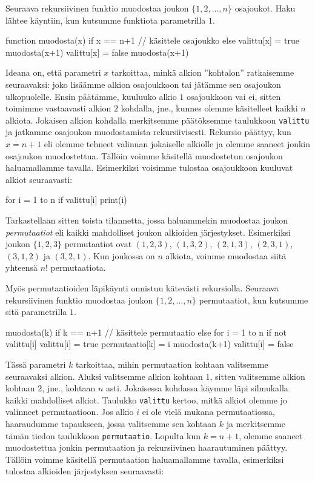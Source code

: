 Seuraava rekursiivinen funktio muodostaa joukon
$\{1,2,\dots,n\}$ osajoukot.
Haku lähtee käyntiin, kun kutsumme funktiota
parametrilla $1$.

\begin{code}
function muodosta(x)
    if x == n+1
        // käsittele osajoukko
    else
        valittu[x] = true
        muodosta(x+1)
        valittu[x] = false
        muodosta(x+1)
\end{code}

Ideana on, että parametri $x$ tarkoittaa, minkä alkion
''kohtalon'' ratkaisemme seuraavaksi: joko lisäämme alkion
osajoukkoon tai jätämme sen osa\-joukon ulkopuolelle.
Ensin päätämme, kuuluuko alkio $1$ osajoukkoon vai ei,
sitten toimimme vastaavasti alkion $2$ kohdalla, jne.,
kunnes olemme käsitelleet kaikki $n$ alkiota.
Jokaisen alkion kohdalla merkitsemme päätöksemme taulukkoon
\texttt{valittu} ja jatkamme osajoukon muodostamista rekursiivisesti.
Rekursio päät\-tyy, kun $x=n+1$ eli olemme tehneet valinnan
jokaiselle alkiolle ja olemme saaneet jonkin osajoukon muodostettua.
Tällöin voimme käsitellä muodostetun osajoukon haluamallamme tavalla.
Esimerkiksi voisimme tulostaa osajoukkoon kuuluvat alkiot seuraavasti:

\begin{code}
for i = 1 to n
    if valittu[i]
        print(i)
\end{code}

Tarkastellaan sitten toista tilannetta, jossa haluammekin
muodostaa joukon \emph{permutaatiot}
eli kaikki mahdolliset joukon alkioiden järjestykset.
Esimerkiksi joukon $\{1,2,3\}$ permutaatiot ovat
$(1,2,3)$, $(1,3,2)$, $(2,1,3)$, $(2,3,1)$, $(3,1,2)$ ja $(3,2,1)$.
Kun joukossa on $n$ alkiota, voimme muodostaa siitä yhteensä $n!$ permutaatiota.

Myös permutaatioiden läpikäynti onnistuu kätevästi rekursiolla.
Seuraava rekursiivinen funktio muodostaa joukon $\{1,2,\dots,n\}$ permutaatiot,
kun kutsumme sitä parametrilla $1$.

\begin{code}
muodosta(k)
    if k == n+1
        // käsittele permutaatio
    else
        for i = 1 to n
            if not valittu[i]
                valittu[i] = true
                permutaatio[k] = i
                muodosta(k+1)
                valittu[i] = false
\end{code}

Tässä parametri $k$ tarkoittaa, mihin permutaation kohtaan
valitsemme seuraavaksi alkion.
Aluksi valitsemme alkion kohtaan $1$, sitten
valitsemme alkion kohtaan $2$, jne., kohtaan $n$ asti.
Jokaisessa kohdassa käymme läpi silmukalla kaikki mahdolliset alkiot.
Taulukko \texttt{valittu} kertoo, mitkä alkiot olemme jo valinneet
permutaatioon.
Jos alkio $i$ ei ole vielä mukana permutaatiossa, haaraudumme tapaukseen,
jossa valitsemme sen kohtaan $k$ ja merkitsemme tämän tiedon
taulukkoon \texttt{permutaatio}.
Lopulta kun $k=n+1$, olemme saaneet muodostettua jonkin permutaation
ja rekursiivinen haarautuminen päättyy.
Tällöin voimme käsitellä permutaation haluamallamme tavalla,
esimerkiksi tulostaa alkioiden järjestyksen seuraavasti:

